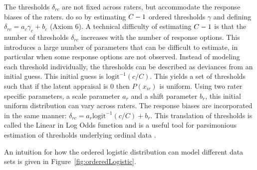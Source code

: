 \documentclass{article}
\newcommand{\Irater}{r}
\newcommand{\Iitem}{i}
\newcommand{\Incat}{c}
\newcommand{\Tncat}{\expandafter\MakeUppercase\expandafter{\Incat}}
\newcommand{\ilogit}[1]{\text{logit}^{-1}\left(#1\right)}
\begin{document}
The thresholds $\delta_{\Irater\Incat}$ are not fixed across raters, but accommodate the response biases of the raters.  do so by estimating $\Tncat-1$ ordered thresholds $\gamma$ and defining $\delta_{\Irater\Incat} = a_\Incat \gamma_\Incat + b_\Incat$ (Axiom 6). A technical difficulty of estimating $\Tncat-1$ is that the number of thresholds $\delta_{\Irater\Incat}$ increases with the number of response options. This introduces a large number of parameters that can be difficult to estimate, in particular when some response options are not observed. Instead of modeling each threshold individually, the thresholds can be described as deviances from an initial guess. This initial guess is $\ilogit{c/C}$. This yields a set of thresholds such that if the latent appraisal is 0 then $P(x_{\Iitem\Irater})$ is uniform. Using two rater specific parameters, a scale parameter $a_\Irater$ and a shift parameter $b_\Irater$, this initial uniform distribution can vary across raters. The response biases are incorporated in the same manner: $\delta_{\Irater\Incat} = a_\Irater\ilogit{c/C} + b_\Irater$. This translation of thresholds is called the Linear in Log Odds function and is a useful tool for parsimonious estimation of thresholds underlying ordinal data \cite{Fox1995, Gonzalez1999}.

An intuition for how the ordered logistic distribution can model different data sets is given in Figure~\ref{fig:orderedLogistic}. 
\end{document}
